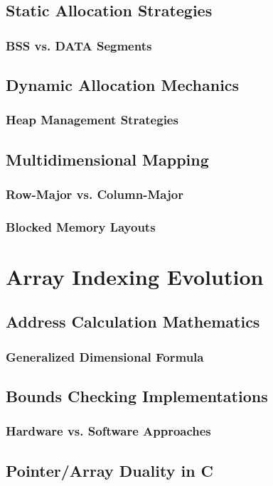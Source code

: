 \documentclass[12pt, oneside]{book}
\begin{document}
	 \section{Static Allocation Strategies}
	 \subsection{BSS vs. DATA Segments}
	 \section{Dynamic Allocation Mechanics}
	 \subsection{Heap Management Strategies}
	 \section{Multidimensional Mapping}
	 \subsection{Row-Major vs. Column-Major}
	 \subsection{Blocked Memory Layouts}
	 
	 \chapter{Array Indexing Evolution}
	 \section{Address Calculation Mathematics}
	 \subsection{Generalized Dimensional Formula}
	 \section{Bounds Checking Implementations}
	 \subsection{Hardware vs. Software Approaches}
	 \section{Pointer/Array Duality in C}
	 
\end{document}
